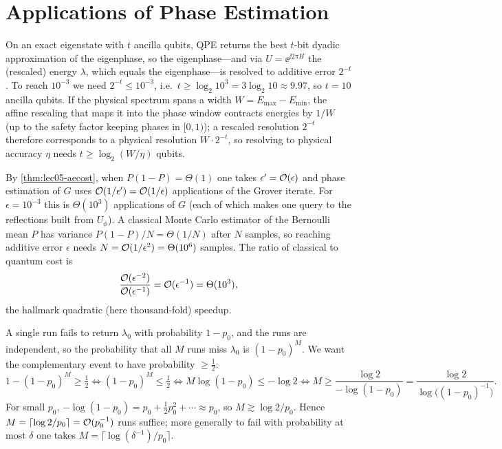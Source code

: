 \chapter{Applications of Phase Estimation}

\begin{solution}
On an exact eigenstate with $t$ ancilla qubits, QPE returns the best $t$-bit
dyadic approximation of the eigenphase, so the eigenphase---and via
$U=\ee^{\ii 2\pi H}$ the (rescaled) energy $\lambda$, which equals the
eigenphase---is resolved to additive error $2^{-t}$. To reach $10^{-3}$ we need
$2^{-t}\le10^{-3}$, i.e.\ $t\ge\log_2 10^3=3\log_2 10\approx9.97$, so $t=10$
ancilla qubits. If the physical spectrum spans a width $W=E_{\max}-E_{\min}$, the
affine rescaling that maps it into the phase window contracts energies by $1/W$
(up to the safety factor keeping phases in $[0,1)$); a rescaled resolution
$2^{-t}$ therefore corresponds to a physical resolution $W\cdot 2^{-t}$, so
resolving to physical accuracy $\eta$ needs $t\ge\log_2(W/\eta)$ qubits.
\end{solution}

\begin{solution}
By \cref{thm:lec05-aecost}, when $P(1-P)=\Theta(1)$ one takes
$\epsilon'=\mathcal{O}(\epsilon)$ and phase estimation of $G$ uses
$\mathcal{O}(1/\epsilon')=\mathcal{O}(1/\epsilon)$ applications of the Grover iterate. For
$\epsilon=10^{-3}$ this is $\Theta(10^{3})$ applications of $G$ (each of which
makes one query to the reflections built from $U_\phi$). A classical Monte Carlo
estimator of the Bernoulli mean $P$ has variance $P(1-P)/N=\Theta(1/N)$ after $N$
samples, so reaching additive error $\epsilon$ needs $N=\mathcal{O}(1/\epsilon^2)
=\Theta(10^{6})$ samples. The ratio of classical to quantum cost is
\[
  \frac{\mathcal{O}(\epsilon^{-2})}{\mathcal{O}(\epsilon^{-1})}=\mathcal{O}(\epsilon^{-1})
  =\Theta(10^{3}),
\]
the hallmark quadratic (here thousand-fold) speedup.
\end{solution}

\begin{solution}
A single run fails to return $\lambda_0$ with probability $1-p_0$, and the runs are
independent, so the probability that all $M$ runs miss $\lambda_0$ is
$(1-p_0)^M$. We want the complementary event to have probability $\ge\tfrac12$:
\[
  1-(1-p_0)^M\ge\tfrac12
  \iff (1-p_0)^M\le\tfrac12
  \iff M\log(1-p_0)\le-\log2
  \iff M\ge\frac{\log 2}{-\log(1-p_0)}
        =\frac{\log 2}{\log\bigl((1-p_0)^{-1}\bigr)}.
\]
For small $p_0$, $-\log(1-p_0)=p_0+\tfrac12 p_0^2+\cdots\approx p_0$, so
$M\gtrsim\log 2/p_0$. Hence $M=\lceil\log 2/p_0\rceil=\mathcal{O}(p_0^{-1})$ runs
suffice; more generally to fail with probability at most $\delta$ one takes
$M=\lceil\log(\delta^{-1})/p_0\rceil$.
\end{solution}


